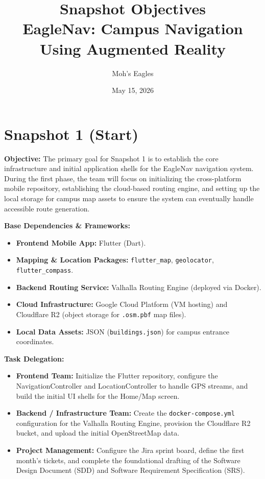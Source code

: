 \documentclass[12pt]{article}
\title{\textbf{Snapshot Objectives}\\ \large EagleNav: Campus Navigation Using Augmented Reality}
\author{Moh's Eagles}
\date{May 15, 2026}
\begin{document}
\maketitle

\section*{Snapshot 1 (Start)}
\textbf{Objective:} 
The primary goal for Snapshot 1 is to establish the core infrastructure and initial application shells for the EagleNav navigation system. During the first phase, the team will focus on initializing the cross-platform mobile repository, establishing the cloud-based routing engine, and setting up the local storage for campus map assets to ensure the system can eventually handle accessible route generation.

\textbf{Base Dependencies \& Frameworks:}
\begin{itemize}[noitemsep]
    \item \textbf{Frontend Mobile App:} Flutter (Dart).
    \item \textbf{Mapping \& Location Packages:} \texttt{flutter\_map}, \texttt{geolocator}, \texttt{flutter\_compass}.
    \item \textbf{Backend Routing Service:} Valhalla Routing Engine (deployed via Docker).
    \item \textbf{Cloud Infrastructure:} Google Cloud Platform (VM hosting) and Cloudflare R2 (object storage for \texttt{.osm.pbf} map files).
    \item \textbf{Local Data Assets:} JSON (\texttt{buildings.json}) for campus entrance coordinates.
\end{itemize}

\textbf{Task Delegation:}
\begin{itemize}[noitemsep]
    \item \textbf{Frontend Team:} Initialize the Flutter repository, configure the NavigationController and LocationController to handle GPS streams, and build the initial UI shells for the Home/Map screen.
    \item \textbf{Backend / Infrastructure Team:} Create the \texttt{docker-compose.yml} configuration for the Valhalla Routing Engine, provision the Cloudflare R2 bucket, and upload the initial OpenStreetMap data.
    \item \textbf{Project Management:} Configure the Jira sprint board, define the first month's tickets, and complete the foundational drafting of the Software Design Document (SDD) and Software Requirement Specification (SRS).
\end{itemize}
\end{document}
